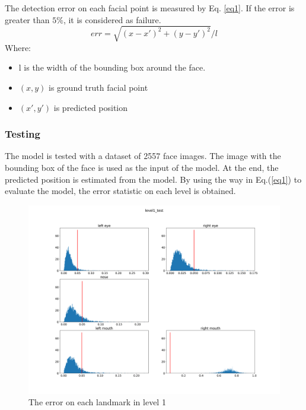 The detection error on each facial point is measured by Eq. \ref{eq1}. If the error is greater than $5\%$, it is considered as failure.
\begin{equation}
	err = \sqrt{(x-x')^2 + (y-y')^2}/l
	\label{eq1}
\end{equation}
Where:
\begin{itemize}
	\item l is the width of the bounding box around the face.
	\item $(x,y)$ is ground truth facial point
	\item $(x',y')$ is predicted position
\end{itemize}
\subsubsection{Testing}
The model is tested with a dataset of 2557 face images. The image with the bounding box of the face is used as the input of the model. At the end, the predicted position is estimated from the model. By using the way in Eq.(\ref{eq1}) to evaluate the model, the error statistic on each level is obtained.
\begin{figure}[h]
	\centering
	\includegraphics[scale=0.3]{images/level1_test}
	\caption{The error on each landmark in level 1}
	\label{1Fconv}
\end{figure}
